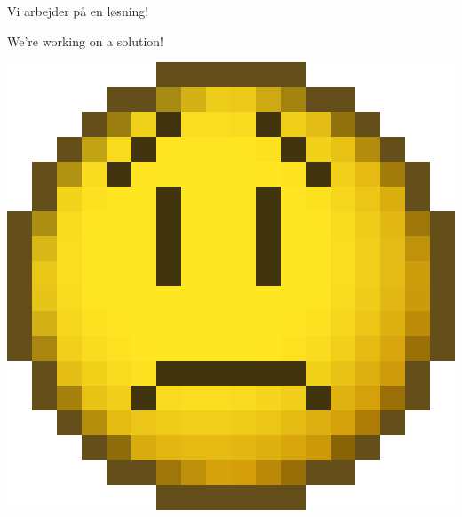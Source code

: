 \documentclass{article}
\begin{document}
\maketitle

\null
\vspace{-1cm}

\begin{center}

\vspace{-1cm}


\vspace{-0.8cm}

\huge

Vi arbejder på en løsning!

\english


\vspace{-1cm}

We're working on a solution!

\vspace{0.3cm}

\includegraphics[height=.33\textheight]{billeder/sad-smiley-pixelated.png}

\end{center}

\dansk

\underskriv
\end{document}
